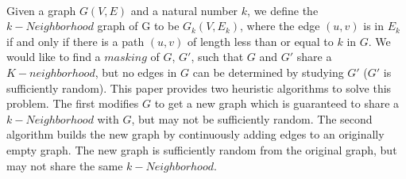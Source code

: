 
\\
\indent Given a graph $G(V,E)$ and a natural number $k$, we define the $k-Neighborhood$  graph of G to be $G_k(V, E_k)$, where the edge $(u,v)$ is in $E_k$ if and only if there is a path $(u,v)$ of length less than or equal to $k$ in $G$. We would like to find a $masking$ of $G$, $G'$, such that $G$ and $G'$ share a $K-neighborhood$, but no edges in $G$ can be determined by studying $G'$ ($G'$ is sufficiently random). This paper provides two heuristic algorithms to solve this problem. The first modifies $G$ to get a new graph which is guaranteed to share a $k-Neighborhood$ with $G$, but may not be sufficiently random. The second algorithm builds the new graph by continuously adding edges to an originally empty graph. The new graph is sufficiently random from the original graph, but may not share the same $k-Neighborhood$.
\\\\
